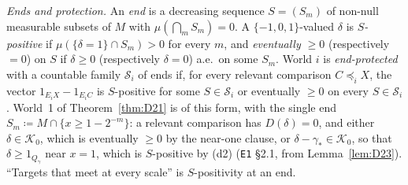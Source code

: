 \documentclass[11pt]{article}
\theoremstyle{definition}
\theoremstyle{remark}
\newcommand{\src}[1]{\texttt{#1}}
\begin{document}
\emph{Ends and protection.} An \emph{end} is a decreasing sequence $S=(S_m)$ of non-null measurable subsets of $M$ with $\mu(\bigcap_mS_m)=0$. A $\{-1,0,1\}$-valued $\delta$ is \emph{$S$-positive} if $\mu(\{\delta=1\}\cap S_m)>0$ for every $m$, and \emph{eventually $\ge0$} (respectively \emph{$=0$}) on $S$ if $\delta\ge0$ (respectively $\delta=0$) a.e.\ on some $S_m$. World $i$ is \emph{end-protected} with a countable family $\mathcal S_i$ of ends if, for every relevant comparison $C\preceq_iX$, the vector $1_{E_iX}-1_{E_iC}$ is $S$-positive for some $S\in\mathcal S_i$ or eventually $\ge0$ on every $S\in\mathcal S_i$. World~1 of Theorem~\ref{thm:D21} is of this form, with the single end $S_m\coloneqq M\cap\{x\ge1-2^{-m}\}$: a relevant comparison has $D(\delta)=0$, and either $\delta\in\mathcal K_0$, which is eventually $\ge0$ by the near-one clause, or $\delta-\gamma_*\in\mathcal K_0$, so that $\delta\ge1_{Q_\gamma}$ near $x=1$, which is $S$-positive by (d2) (\src{E1} \S2.1, from Lemma~\ref{lem:D23}). ``Targets that meet at every scale'' is $S$-positivity at an end.
\end{document}
